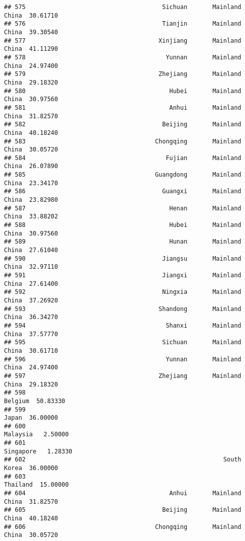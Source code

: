 \documentclass[
]{article}
\begin{document}
\begin{verbatim}
## 575                                      Sichuan       Mainland China  30.61710
## 576                                      Tianjin       Mainland China  39.30540
## 577                                     Xinjiang       Mainland China  41.11290
## 578                                       Yunnan       Mainland China  24.97400
## 579                                     Zhejiang       Mainland China  29.18320
## 580                                        Hubei       Mainland China  30.97560
## 581                                        Anhui       Mainland China  31.82570
## 582                                      Beijing       Mainland China  40.18240
## 583                                    Chongqing       Mainland China  30.05720
## 584                                       Fujian       Mainland China  26.07890
## 585                                    Guangdong       Mainland China  23.34170
## 586                                      Guangxi       Mainland China  23.82980
## 587                                        Henan       Mainland China  33.88202
## 588                                        Hubei       Mainland China  30.97560
## 589                                        Hunan       Mainland China  27.61040
## 590                                      Jiangsu       Mainland China  32.97110
## 591                                      Jiangxi       Mainland China  27.61400
## 592                                      Ningxia       Mainland China  37.26920
## 593                                     Shandong       Mainland China  36.34270
## 594                                       Shanxi       Mainland China  37.57770
## 595                                      Sichuan       Mainland China  30.61710
## 596                                       Yunnan       Mainland China  24.97400
## 597                                     Zhejiang       Mainland China  29.18320
## 598                                                           Belgium  50.83330
## 599                                                             Japan  36.00000
## 600                                                          Malaysia   2.50000
## 601                                                         Singapore   1.28330
## 602                                                       South Korea  36.00000
## 603                                                          Thailand  15.00000
## 604                                        Anhui       Mainland China  31.82570
## 605                                      Beijing       Mainland China  40.18240
## 606                                    Chongqing       Mainland China  30.05720

\end{verbatim}
\end{document}
